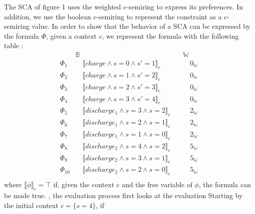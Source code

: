 \begin{example}
The SCA of figure 1 uses the weighted c-semiring to express its preferences. In addition, we use the boolean c-semiring to represent the constraint as a c-semiring value. In order to show that the behavior of a SCA can be expressed by the formula $\Phi$, given a context $c$, we represent the formula with the following table :
$$
\begin{array}{l|cr}
& \mathbb{B} & \mathbb{W}\\
\hline
\Phi_1 & \quad \llbracket charge \land s = 0 \land s'= 1 \rrbracket_{c}  \quad & \quad 0_\mathbb{W} \\
\Phi_2 & \quad \llbracket charge \land s = 1 \land s'= 2 \rrbracket_{c} \quad & \quad 0_\mathbb{W} \\
\Phi_3 & \quad \llbracket charge \land s = 2 \land s'= 3 \rrbracket_{c} \quad & \quad 0_\mathbb{W} \\
\Phi_4 & \quad \llbracket charge \land s = 3 \land s'= 4 \rrbracket_{c} \quad & \quad 0_\mathbb{W} \\
\Phi_5 & \quad \llbracket discharge_{1} \land s = 3 \land s = 2 \rrbracket_{c} \quad & \quad 2_\mathbb{W} \\
\Phi_6 & \quad \llbracket discharge_{1} \land s = 2 \land s = 1 \rrbracket_{c} \quad & \quad 2_\mathbb{W} \\
\Phi_7 & \quad \llbracket discharge_{1} \land s = 1 \land s = 0 \rrbracket_{c} \quad & \quad 2_\mathbb{W} \\
\Phi_8 & \quad \llbracket discharge_{2} \land s = 4 \land s = 2 \rrbracket_{c} \quad & \quad 5_\mathbb{W} \\
\Phi_9 & \quad \llbracket discharge_{2} \land s = 3 \land s = 1 \rrbracket_{c} \quad & \quad 5_\mathbb{W} \\
\Phi_{10} & \quad \llbracket discharge_{2} \land s = 2 \land s = 0 \rrbracket_{c} \quad & \quad 5_\mathbb{W} \\
\end{array} 
$$
where $\llbracket \phi \rrbracket_{c} = \top$ if, given the context c and the free variable of $\phi$, the formula can be made true.
, the evaluation process first looks at the evaluation Starting by the initial context $c=\{s=4\}$, if 


\end{example}
